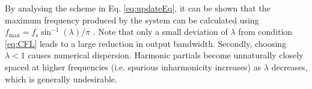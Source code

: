 %
By analysing the scheme in Eq. \eqref{eq:updateEq}, it can be shown that the maximum frequency produced by the system can be calculated using $f_\text{max} = f_\text{s} \sin^{-1}(\lambda)/\pi$ \cite[Chap. 6]{bilbao2009}.
%
Note that only a small deviation of $\lambda$ from condition \eqref{eq:CFL} leads to a large reduction in output bandwidth.
%
Secondly, choosing $\lambda < 1$ causes numerical dispersion. %
Harmonic partials become unnaturally closely spaced at higher frequencies (i.e. spurious inharmonicity increases) as $\lambda$ decreases, which is generally undesirable.

